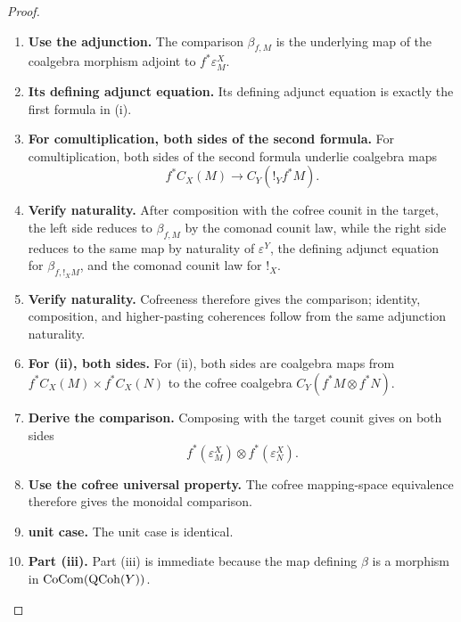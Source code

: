 \begin{proof}
\leavevmode
\begin{enumerate}[label=\textup{(\arabic*)}]
    \item \textbf{Use the adjunction.}
    The comparison \(\beta_{f,M}\) is the underlying map of the coalgebra morphism adjoint to
    \(f^*\varepsilon^X_M\).

    \item \textbf{Its defining adjunct equation.}
    Its defining adjunct equation is exactly the first formula in \textup{(i)}.

    \item \textbf{For comultiplication, both sides of the second formula.}
    For comultiplication, both sides of the second formula underlie coalgebra maps
    \[
        f^*C_X(M)\longrightarrow C_Y(!_Yf^*M).
    \]

    \item \textbf{Verify naturality.}
    After composition with the cofree counit in the target, the left side reduces to \(\beta_{f,M}\)
    by the comonad counit law, while the right side reduces to the same map by naturality of
    \(\varepsilon^Y\), the defining adjunct equation for \(\beta_{f,!_XM}\), and the comonad counit law for
    \(!_X\).

    \item \textbf{Verify naturality.}
    Cofreeness therefore gives the comparison; identity, composition, and higher-pasting
    coherences follow from the same adjunction naturality.

    \item \textbf{For (ii), both sides.}
    For \textup{(ii)}, both sides are coalgebra maps from \(f^*C_X(M)\times f^*C_X(N)\) to the cofree coalgebra
    \(C_Y(f^*M\otimes f^*N)\).

    \item \textbf{Derive the comparison.}
    Composing with the target counit gives on both sides
    \[
        f^*(\varepsilon^X_M)\otimes f^*(\varepsilon^X_N).
    \]

    \item \textbf{Use the cofree universal property.}
    The cofree mapping-space equivalence therefore gives the monoidal comparison.

    \item \textbf{unit case.}
    The unit case is identical.

    \item \textbf{Part (iii).}
    Part \textup{(iii)} is immediate because the map defining \(\beta\) is a morphism in
    \(\operatorname{CoCom}(\operatorname{QCoh}(Y))\).


\end{enumerate}
\end{proof}
